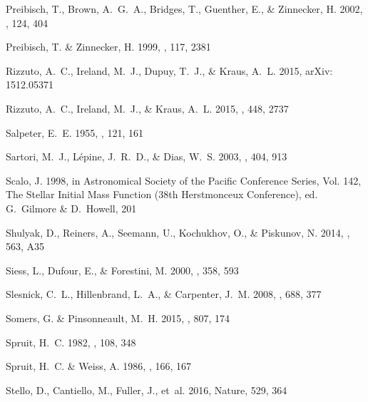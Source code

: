 \documentclass{aa}
\begin{document}
\begin{thebibliography}{71}
{Preibisch}, T., {Brown}, A.~G.~A., {Bridges}, T., {Guenther}, E., \&
  {Zinnecker}, H. 2002, \aj, 124, 404

{Preibisch}, T. \& {Zinnecker}, H. 1999, \aj, 117, 2381

{Rizzuto}, A.~C., {Ireland}, M.~J., {Dupuy}, T.~J., \& {Kraus}, A.~L.
  2015{}, arXiv: 1512.05371

{Rizzuto}, A.~C., {Ireland}, M.~J., \& {Kraus}, A.~L. 2015{},
  \mnras, 448, 2737

{Salpeter}, E.~E. 1955, \apj, 121, 161

{Sartori}, M.~J., {L{\'e}pine}, J.~R.~D., \& {Dias}, W.~S. 2003, \aap, 404, 913

{Scalo}, J. 1998, in Astronomical Society of the Pacific Conference Series,
  Vol. 142, The Stellar Initial Mass Function (38th Herstmonceux Conference),
  ed. G.~{Gilmore} \& D.~{Howell}, 201

{Shulyak}, D., {Reiners}, A., {Seemann}, U., {Kochukhov}, O., \& {Piskunov}, N.
  2014, \aap, 563, A35

{Siess}, L., {Dufour}, E., \& {Forestini}, M. 2000, \aap, 358, 593

{Slesnick}, C.~L., {Hillenbrand}, L.~A., \& {Carpenter}, J.~M. 2008, \apj, 688,
  377

{Somers}, G. \& {Pinsonneault}, M.~H. 2015, \apj, 807, 174

{Spruit}, H.~C. 1982, \aap, 108, 348

{Spruit}, H.~C. \& {Weiss}, A. 1986, \aap, 166, 167

Stello, D., Cantiello, M., Fuller, J., {et~al.} 2016, Nature, 529, 364


\end{thebibliography}
\end{document}
